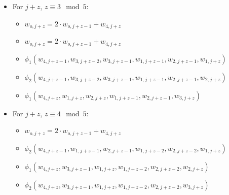 \begin{itemize}
\begin{itemize}
        \end{itemize}
    \item For $j + z$, $z \equiv 3 \mod 5$:
        \begin{itemize}
            \item $w_{o, j + z} = 2 \cdot w_{o, j + z - 1} + w_{4, j + z}$
            \item $w_{o, j + z} = 2 \cdot w_{o, j + z - 1} + w_{4, j + z}$
            \item $\phi_1(w_{4, j + z - 1}, w_{3, j + z - 2}, w_{3, j + z - 1}, w_{1, j + z - 1}, w_{2, j + z - 1}, w_{1, j + z})$
            \item $\phi_2(w_{4, j + z - 1}, w_{3, j + z - 2}, w_{3, j + z - 1}, w_{1, j + z - 1}, w_{2, j + z - 1}, w_{2, j + z})$
            \item $\phi_1(w_{4, j + z }, w_{1, j + z }, w_{2, j + z }, w_{1, j + z - 1}, w_{2, j + z - 1}, w_{3, j + z})$
        \end{itemize}
    \item For $j + z$, $z \equiv 4 \mod 5$:
        \begin{itemize}
            \item $w_{o, j + z} = 2 \cdot w_{o, j + z - 1} + w_{4, j + z}$
            \item $\phi_2(w_{4, j + z - 1}, w_{1, j + z - 1}, w_{2, j + z - 1}, w_{1, j + z - 2}, w_{2, j + z - 2}, w_{1, j + z})$
            \item $\phi_1(w_{4, j + z }, w_{3, j + z - 1}, w_{1, j + z }, w_{1, j + z - 2}, w_{2, j + z - 2}, w_{2, j + z})$
            \item $\phi_2(w_{4, j + z }, w_{3, j + z - 1}, w_{1, j + z }, w_{1, j + z - 2}, w_{2, j + z - 2}, w_{3, j + z})$
        \end{itemize}
\end{itemize}
